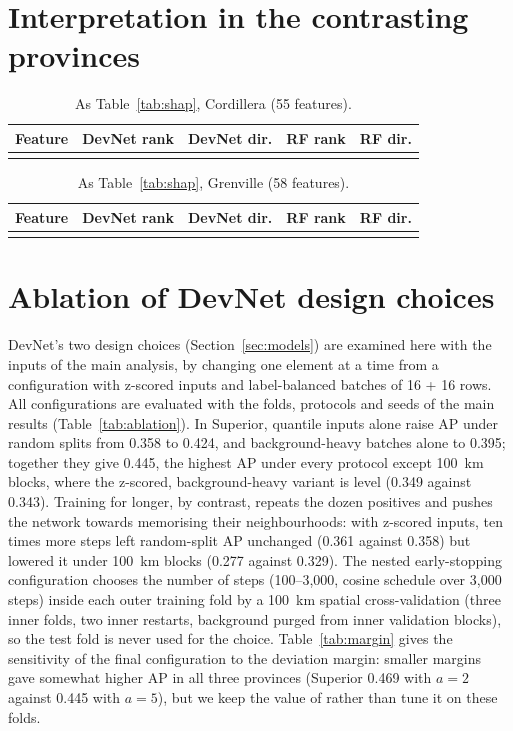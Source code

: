 \documentclass[pdflatex,sn-apa]{sn-jnl}
\begin{document}
\begin{appendices}
\clearpage
\section{Interpretation in the contrasting provinces}\label{app:shap}

\begin{table}[!h]
\caption{As Table~\ref{tab:shap}, Cordillera (55 features).}\label{tab:shap-cord}
\footnotesize
\begin{tabular*}{\textwidth}{@{\extracolsep\fill}lcccc}
\toprule
Feature & DevNet rank & DevNet dir. & RF rank & RF dir. \\
\midrule
\botrule
\end{tabular*}
\end{table}

\begin{table}[!h]
\caption{As Table~\ref{tab:shap}, Grenville (58 features).}\label{tab:shap-gren}
\footnotesize
\begin{tabular*}{\textwidth}{@{\extracolsep\fill}lcccc}
\toprule
Feature & DevNet rank & DevNet dir. & RF rank & RF dir. \\
\midrule
\botrule
\end{tabular*}
\end{table}

\clearpage
\section{Ablation of DevNet design choices}\label{app:sensitivity}

DevNet's two design choices (Section~\ref{sec:models}) are examined here with the inputs of the main analysis, by changing one element at a time from a configuration with z-scored inputs and label-balanced batches of 16 + 16 rows. All configurations are evaluated with the folds, protocols and seeds of the main results (Table~\ref{tab:ablation}). In Superior, quantile inputs alone raise AP under random splits from 0.358 to 0.424, and background-heavy batches alone to 0.395; together they give 0.445, the highest AP under every protocol except 100~km blocks, where the z-scored, background-heavy variant is level (0.349 against 0.343). Training for longer, by contrast, repeats the dozen positives and pushes the network towards memorising their neighbourhoods: with z-scored inputs, ten times more steps left random-split AP unchanged (0.361 against 0.358) but lowered it under 100~km blocks (0.277 against 0.329). The nested early-stopping configuration chooses the number of steps (100--3,000, cosine schedule over 3,000 steps) inside each outer training fold by a 100~km spatial cross-validation (three inner folds, two inner restarts, background purged from inner validation blocks), so the test fold is never used for the choice. Table~\ref{tab:margin} gives the sensitivity of the final configuration to the deviation margin: smaller margins gave somewhat higher AP in all three provinces (Superior 0.469 with $a = 2$ against 0.445 with $a = 5$), but we keep the value of \citet{Pang2019} rather than tune it on these folds.


\end{appendices}
\end{document}
